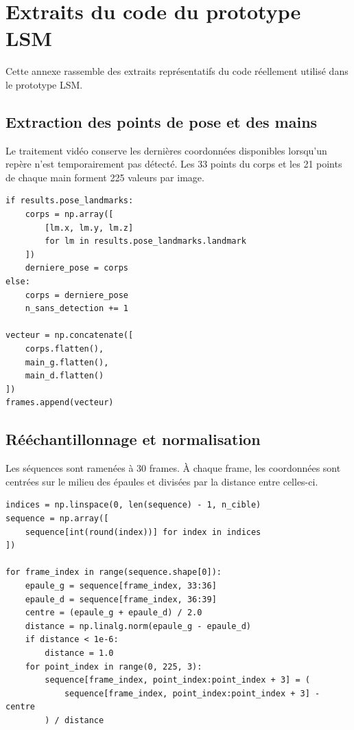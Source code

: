 \chapter{Extraits du code du prototype LSM}

Cette annexe rassemble des extraits représentatifs du code réellement utilisé
dans le prototype LSM.

\section{Extraction des points de pose et des mains}

Le traitement vidéo conserve les dernières coordonnées disponibles lorsqu'un
repère n'est temporairement pas détecté. Les 33 points du corps et les 21 points
de chaque main forment 225 valeurs par image.

\begin{verbatim}
if results.pose_landmarks:
    corps = np.array([
        [lm.x, lm.y, lm.z]
        for lm in results.pose_landmarks.landmark
    ])
    derniere_pose = corps
else:
    corps = derniere_pose
    n_sans_detection += 1

vecteur = np.concatenate([
    corps.flatten(),
    main_g.flatten(),
    main_d.flatten()
])
frames.append(vecteur)
\end{verbatim}

\section{Rééchantillonnage et normalisation}

Les séquences sont ramenées à 30 frames. À chaque frame, les coordonnées sont
centrées sur le milieu des épaules et divisées par la distance entre celles-ci.

\begin{verbatim}
indices = np.linspace(0, len(sequence) - 1, n_cible)
sequence = np.array([
    sequence[int(round(index))] for index in indices
])

for frame_index in range(sequence.shape[0]):
    epaule_g = sequence[frame_index, 33:36]
    epaule_d = sequence[frame_index, 36:39]
    centre = (epaule_g + epaule_d) / 2.0
    distance = np.linalg.norm(epaule_g - epaule_d)
    if distance < 1e-6:
        distance = 1.0
    for point_index in range(0, 225, 3):
        sequence[frame_index, point_index:point_index + 3] = (
            sequence[frame_index, point_index:point_index + 3] - centre
        ) / distance
\end{verbatim}

